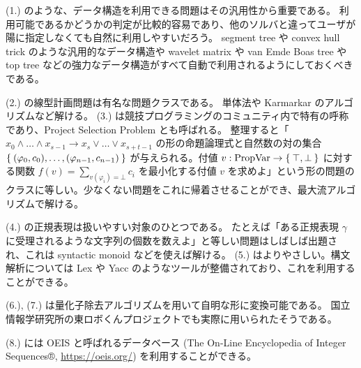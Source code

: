 \documentclass{ltjsarticle}
\begin{document}
(1.) のような、データ構造を利用できる問題はその汎用性から重要である。
利用可能であるかどうかの判定が比較的容易であり、他のソルバと違ってユーザが陽に指定しなくても自然に利用しやすいだろう。
segment tree や convex hull trick のような汎用的なデータ構造や wavelet matrix や van Emde Boas tree や top tree などの強力なデータ構造がすべて自動で利用されるようにしておくべきである。

(2.) の線型計画問題は有名な問題クラスである。
単体法や Karmarkar のアルゴリズムなど解ける。
(3.) は競技プログラミングのコミュニティ内で特有の呼称であり、Project Selection Problem とも呼ばれる。
整理すると「$x_0 \land \dots \land x_{s - 1} \to x_s \lor \dots \lor x_{s + t - 1}$ の形の命題論理式と自然数の対の集合 $\Set{ (\varphi_0, c_0), \dots, (\varphi_{n-1}, c_{n-1}) }$ が与えられる。付値 $v : \mathrm{PropVar} \to \Set{ \top, \bot }$ に対する関数 $f(v) = \sum_{v(\varphi_i) = \bot} c_i$ を最小化する付値 $v$ を求めよ」という形の問題のクラスに等しい。少なくない問題をこれに帰着させることができ、最大流アルゴリズムで解ける。

(4.) の正規表現は扱いやすい対象のひとつである。
たとえば「ある正規表現 $\gamma$ に受理されるような文字列の個数を数えよ」と等しい問題はしばしば出題され、これは syntactic monoid \cite{hopcroft} などを使えば解ける。
(5.) はよりやさしい。構文解析については Lex や Yacc のようなツールが整備されており、これを利用することができる。

(6.), (7.) は量化子除去アルゴリズムを用いて自明な形に変換可能である。
国立情報学研究所の東ロボくんプロジェクトでも実際に用いられたそうである\cite{tourobo}。

(8.) には OEIS と呼ばれるデータベース (The On-Line Encyclopedia of Integer Sequences®, \url{https://oeis.org/}) を利用することができる。




\end{document}
